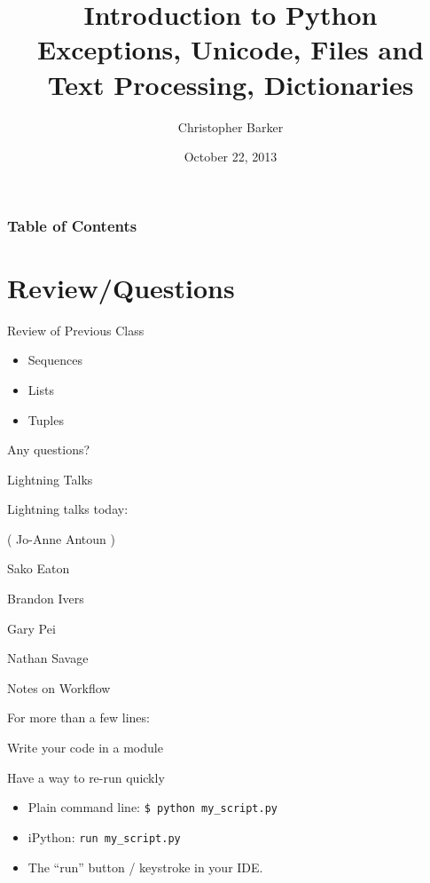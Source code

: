 \documentclass{beamer}
\title[Intro to Python: Week 4]{Introduction  to Python\\ Exceptions, Unicode, Files and Text Processing, Dictionaries}
\author{Christopher Barker}
\institute{UW Continuing Education}
\date{October 22, 2013}
\begin{document}
\begin{frame}
  \titlepage
\end{frame}

\begin{frame}
\frametitle{Table of Contents}
  \tableofcontents
\end{frame}


\section{Review/Questions}

\begin{frame}{Review of Previous Class}

\begin{itemize}
  \item Sequences
  \item Lists
  \item Tuples
\end{itemize}

\vfill
{\Large Any questions?}

\end{frame}


\begin{frame}{Lightning Talks}

\vfill
{\LARGE Lightning talks today:}

\vfill
{\Large ( Jo-Anne Antoun )}

\vfill
{\Large
 Sako Eaton

\vfill
Brandon Ivers

\vfill
Gary Pei

\vfill
Nathan Savage

}
\vfill

\end{frame}


\begin{frame}[fragile]{Notes on Workflow}

  \vfill
  {\Large For more than a few lines:}

  \vfill
  {\large Write your code in a module}

  \vfill
  {\large Have a way to re-run quickly}
  \begin{itemize}
    \item Plain command line: \verb|$ python my_script.py|
    \item iPython: \verb|run my_script.py|
    \item The ``run'' button / keystroke in your IDE.
  \end{itemize}

  \vfill

\end{frame}
\end{document}
